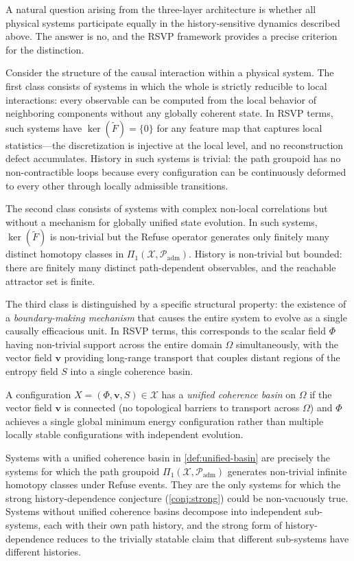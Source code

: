 \documentclass[12pt, oneside]{memoir}
\newcommand{\X}{\mathcal{X}}
\newcommand{\Ft}{\widetilde{F}}
\newcommand{\Padm}{\mathcal{P}_{\mathrm{adm}}}
\newcommand{\bv}{\mathbf{v}}
\begin{document}
A natural question arising from the three-layer architecture is whether all physical
systems participate equally in the history-sensitive dynamics described above.  The
answer is no, and the RSVP framework provides a precise criterion for the distinction.

Consider the structure of the causal interaction within a physical system.  The first
class consists of systems in which the whole is strictly reducible to local interactions:
every observable can be computed from the local behavior of neighboring components
without any globally coherent state.  In RSVP terms, such systems have $\ker(\Ft) =
\{0\}$ for any feature map that captures local statistics---the discretization is
injective at the local level, and no reconstruction defect accumulates.  History in such
systems is trivial: the path groupoid has no non-contractible loops because every
configuration can be continuously deformed to every other through locally admissible
transitions.

The second class consists of systems with complex non-local correlations but without a
mechanism for globally unified state evolution.  In such systems, $\ker(\Ft)$ is
non-trivial but the Refuse operator generates only finitely many distinct homotopy classes
in $\Pi_1(\X, \Padm)$.  History is non-trivial but bounded: there are finitely many
distinct path-dependent observables, and the reachable attractor set is finite.

The third class is distinguished by a specific structural property: the existence of a
\emph{boundary-making mechanism} that causes the entire system to evolve as a single
causally efficacious unit.  In RSVP terms, this corresponds to the scalar field $\Phi$
having non-trivial support across the entire domain $\Omega$ simultaneously, with the
vector field $\bv$ providing long-range transport that couples distant regions of the
entropy field $S$ into a single coherence basin.

\begin{definition}
\label{def:unified-basin}
A configuration $X = (\Phi, \bv, S) \in \X$ has a \emph{unified coherence basin} on
$\Omega$ if the vector field $\bv$ is connected (no topological barriers to transport
across $\Omega$) and $\Phi$ achieves a single global minimum energy configuration rather
than multiple locally stable configurations with independent evolution.
\end{definition}

Systems with a unified coherence basin in \cref{def:unified-basin} are precisely the
systems for which the path groupoid $\Pi_1(\X, \Padm)$ generates non-trivial infinite
homotopy classes under Refuse events.  They are the only systems for which the strong
history-dependence conjecture (\cref{conj:strong}) could be non-vacuously true.  Systems
without unified coherence basins decompose into independent sub-systems, each with their
own path history, and the strong form of history-dependence reduces to the trivially
statable claim that different sub-systems have different histories.
\end{document}
